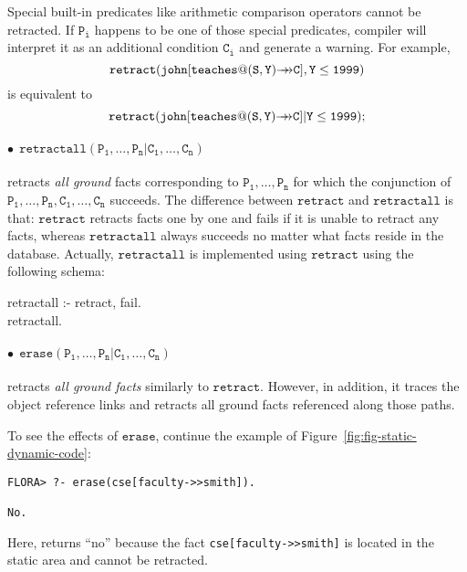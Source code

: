 \documentclass[11pt]{report}
\begin{document}
Special built-in predicates like arithmetic comparison operators cannot be
retracted.  If $\mathtt{P_i}$ happens to be one of those special
predicates, \FLORA compiler will interpret it as an additional condition
$\mathtt{C_i}$ and generate a warning. For example,
\begin{displaymath}
\mathtt{retract(john[teaches@(S,Y){{\rightarrow\!\!\!\!\rightarrow}}C],Y\leq1999)}
\end{displaymath}
is equivalent to
\begin{displaymath}
\mathtt{retract(john[teaches@(S,Y){{\rightarrow\!\!\!\!\rightarrow}}C]|Y\leq1999)};
\end{displaymath}

\paragraph{$\bullet~~\mathtt{retractall(P_1,\ldots,P_n | C_1,\ldots,C_n)}$} retracts \emph{all ground}
facts corresponding to $\mathtt{P_1,\ldots,P_n}$ for which the conjunction
of $\mathtt{P_1,\ldots,P_n,C_1,\ldots,C_n}$ succeeds. The difference
between $\mathtt{retract}$ and $\mathtt{retractall}$ is that:
$\mathtt{retract}$ retracts facts one by one and fails if it is unable to
retract any facts, whereas $\mathtt{retractall}$ always succeeds no matter
what facts reside in the database. Actually, $\mathtt{retractall}$ is
implemented using $\mathtt{retract}$ using the following schema:
\begin{qrules}
retractall :- retract, fail. \\
retractall.
\end{qrules}

\paragraph{$\bullet~~\mathtt{erase(P_1,\ldots,P_n | C_1,\ldots,C_n)}$}
retracts \emph{all ground facts} 
similarly to $\mathtt{retract}$. However, in addition, it traces the object
reference links and retracts all ground facts referenced along those paths.

To see the effects of $\mathtt{erase}$, continue
the example of Figure~\ref{fig:fig-static-dynamic-code}:
\begin{verbatim}
FLORA> ?- erase(cse[faculty->>smith]).

No.
\end{verbatim}
Here, \FLORA returns ``no'' because the fact {\tt cse[faculty->>smith]} is
located in the static area and cannot be retracted.
\end{document}
